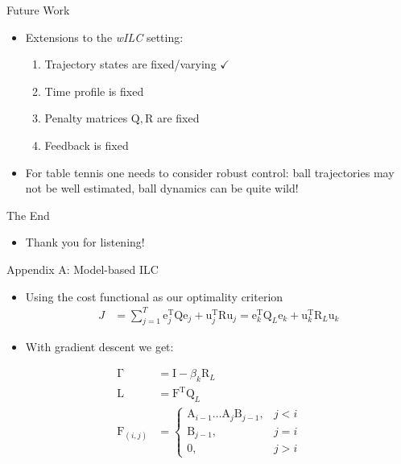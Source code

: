 \documentclass[handout]{beamer}
\newcommand{\boldvec}[1]{\boldsymbol{\mathrm{#1}}}
\let\vec\boldvec
\newcommand{\error}{\vec{e}} %
\newcommand{\sysInput}{\vec{u}} %
\newcommand{\qmatrix}{\vec{\Gamma}} %
\newcommand{\lmatrix}{\vec{L}} %
\newcommand{\ValueFunction}{J}
\newcommand{\alg}{\emph{wILC }}
\begin{document}
\begin{frame}{Future Work}
\begin{itemize}
\item Extensions to the \alg setting: 
\begin{enumerate}
\item Trajectory states are fixed/varying $\checkmark$
\item Time profile is fixed
\item Penalty matrices $\vec{Q},\vec{R}$ are fixed
\item Feedback is fixed
\end{enumerate}
\item For table tennis one needs to consider robust control: ball trajectories may not be well estimated, ball dynamics can be quite wild!
\end{itemize}
\end{frame}
%
\begin{frame}{The End}
\begin{itemize}
\item Thank you for listening!
\end{itemize}
\end{frame}
%
%
\begin{frame}{Appendix A: Model-based ILC}
\begin{itemize}
\item Using the cost functional as our optimality criterion
\begin{equation}
\begin{aligned}
\ValueFunction &= \sum_{j=1}^{T} \error_j^{\mathrm{T}}\vec{Q}\error_j + \sysInput_j^{\mathrm{T}}\vec{R}\sysInput_j = \error_k^{\mathrm{T}}\vec{Q}_L\error_k + \sysInput_k^{\mathrm{T}}\vec{R}_L\sysInput_k
\end{aligned}
\end{equation}
\item With gradient descent we get: 
\end{itemize}
\begin{equation*}
\begin{aligned}
\qmatrix &= \vec{I} - \beta_k \vec{R}_L \\
\lmatrix &= \vec{F}^{\mathrm{T}}\vec{Q}_L \\
\vec{F}_{(i,j)} &= \left \{
\begin{array}{cc}
\vec{A}_{i-1}\ldots \vec{A}_j\vec{B}_{j-1}, & j < i \\ 
\vec{B}_{j-1}, & j = i \\
\vec{0}, & j > i 
\end{array} \right.
\end{aligned}
\end{equation*}
\end{frame}
\end{document}
